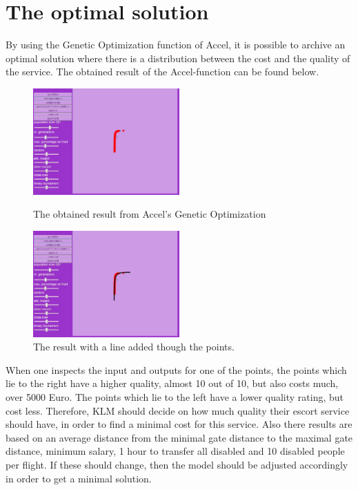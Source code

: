 \documentclass[a4paper, 11pt, notitlepage]{report}
\begin{document}
\section*{The optimal solution}
By using the Genetic Optimization function of Accel, it is possible to archive an optimal solution where there is a distribution between the cost and the quality of the service. The obtained result of the Accel-function can be found below.
\begin{figure}
  \begin{center}
  \includegraphics[width=0.5\textwidth]{figures/optimized}
  \caption{The obtained result from Accel's Genetic Optimization}
    \includegraphics[width=0.5\textwidth]{figures/optimized2}
      \caption{The result with a line added though the points.}
  \end{center}
\end{figure}
When one inspects the input and outputs for one of the points, the points which lie  to the right have a higher quality, almost 10 out of 10, but also costs much, over 5000 Euro. The points which lie to the left have a lower quality rating, but cost less. Therefore, KLM should decide on how much quality their escort service should have, in order to find a minimal cost for this service. Also there results are based on an average distance from the minimal gate distance to the maximal gate distance, minimum salary, 1 hour to transfer all disabled and 10 disabled people per flight. If these should change, then the model should be adjusted accordingly in order to get a minimal solution.
\end{document}
